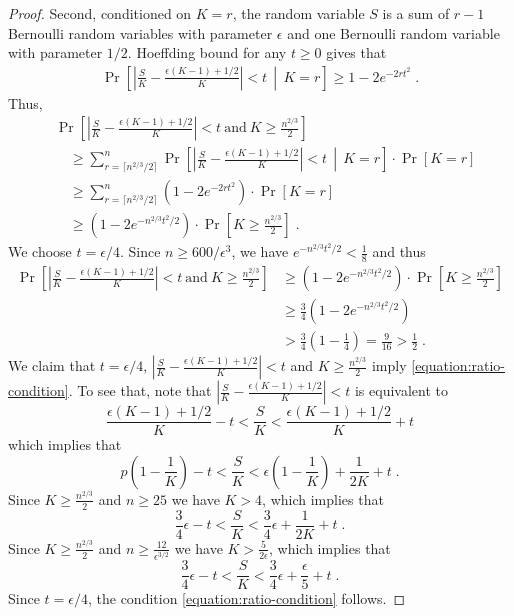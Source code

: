 \documentclass[11pt]{article}
\begin{document}
\begin{proof}
Second, conditioned on $K=r$, the random variable $S$
is a sum of $r-1$ Bernoulli random variables with parameter $\epsilon$
and one Bernoulli random variable with parameter $1/2$. Hoeffding bound for any $t \ge 0$
gives that
\begin{align*}
\Pr \left[ \left| \frac{S}{K} - \frac{\epsilon(K - 1) + 1/2}{K} \right| < t \, \middle| \, K = r \right] \ge 1 - 2 e^{-2 r t^2} \; .
\end{align*}
Thus,
\begin{align*}
& \Pr \left[ \left| \frac{S}{K} - \frac{\epsilon(K - 1) + 1/2}{K} \right| < t \ \text{and} \ K \ge \frac{n^{2/3}}{2} \right] \\
&\quad \ge \sum_{r = \lceil n^{2/3} / 2 \rceil}^n \Pr \left[ \left| \frac{S}{K} - \frac{\epsilon(K - 1) + 1/2}{K} \right| < t  \, \middle| \,  K = r \right] \cdot \Pr[K = r] \\
& \quad \ge \sum_{r = \lceil n^{2/3} / 2 \rceil}^n \left( 1 - 2 e^{-2 r t^2} \right) \cdot \Pr[K = r] \\
& \quad \ge \left( 1 - 2 e^{-n^{2/3}  t^2 / 2} \right) \cdot \Pr \left[ K \ge \frac{n^{2/3}}{2} \right] \; .
\end{align*}
We choose $t = \epsilon/4$. Since $n \ge 600/\epsilon^3$, we have $e^{-n^{2/3}  t^2 / 2} < \frac{1}{8}$ and thus
\begin{align*}
\Pr \left[ \left| \frac{S}{K} - \frac{\epsilon(K - 1) + 1/2}{K} \right| < t \ \text{and} \ K \ge \frac{n^{2/3}}{2} \right]
& \ge \left( 1 - 2 e^{-n^{2/3}  t^2 / 2} \right) \cdot \Pr \left[ K \ge \frac{n^{2/3}}{2} \right] \\
& \ge \frac{3}{4} \left( 1 - 2 e^{-n^{2/3}  t^2 / 2} \right) \\
& > \frac{3}{4} \left( 1 - \frac{1}{4} \right) = \frac{9}{16} > \frac{1}{2} \; .
\end{align*}
We claim that $t = \epsilon/4$,
$\left| \frac{S}{K} - \frac{\epsilon(K - 1) + 1/2}{K} \right| < t$
and $K \ge \frac{n^{2/3}}{2}$ imply \eqref{equation:ratio-condition}.
To see that, note that $\left| \frac{S}{K} - \frac{\epsilon(K - 1) + 1/2}{K} \right| < t$ is equivalent to
$$
\frac{\epsilon(K - 1) + 1/2}{K} - t < \frac{S}{K} < \frac{\epsilon(K - 1) + 1/2}{K} + t
$$
which implies that
$$
p \left(1 - \frac{1}{K} \right) - t < \frac{S}{K} < \epsilon \left(1 - \frac{1}{K} \right) + \frac{1}{2K} + t \; .
$$
Since $K \ge \frac{n^{2/3}}{2}$ and $n \ge 25$ we have $K > 4$, which implies that
$$
\frac{3}{4} \epsilon - t < \frac{S}{K} < \frac{3}{4} \epsilon + \frac{1}{2K} + t \; .
$$
Since $K \ge \frac{n^{2/3}}{2}$ and $n \ge \frac{12}{\epsilon^{3/2}}$ we have $K > \frac{5}{2\epsilon}$, which implies that
$$
\frac{3}{4} \epsilon - t < \frac{S}{K} < \frac{3}{4} \epsilon + \frac{\epsilon}{5} + t \; .
$$
Since $t = \epsilon/4$, the condition \eqref{equation:ratio-condition} follows.
\end{proof}
\end{document}
